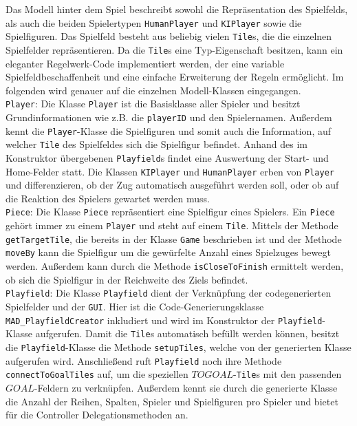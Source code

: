 \documentclass[conference]{IEEEtran}
\begin{document}
Das Modell hinter dem Spiel beschreibt sowohl die Repr\"asentation des Spielfelds, als auch die beiden Spielertypen \texttt{HumanPlayer} und \texttt{KIPlayer} sowie die Spielfiguren. Das Spielfeld besteht aus beliebig vielen \texttt{Tile}s, die die einzelnen Spielfelder repr\"asentieren. Da die \texttt{Tile}s eine Typ-Eigenschaft besitzen, kann ein eleganter Regelwerk-Code implementiert werden, der eine variable Spielfeldbeschaffenheit und eine einfache Erweiterung der Regeln erm\"oglicht.
Im folgenden wird genauer auf die einzelnen Modell-Klassen eingegangen.\\

\texttt{Player}: Die Klasse \texttt{Player} ist die Basisklasse aller Spieler und besitzt Grundinformationen wie z.B. die \texttt{playerID} und den Spielernamen. Au{\ss}erdem kennt die \texttt{Player}-Klasse die Spielfiguren und somit auch die Information, auf welcher \texttt{Tile} des Spielfeldes sich die Spielfigur befindet. Anhand des im Konstruktor \"ubergebenen \texttt{Playfield}s findet eine Auswertung der Start- und Home-Felder statt. Die Klassen \texttt{KIPlayer} und \texttt{HumanPlayer} erben von \texttt{Player} und differenzieren, ob der Zug automatisch ausgef\"uhrt werden soll, oder ob auf die Reaktion des Spielers gewartet werden muss. \\

\texttt{Piece}: Die Klasse \texttt{Piece} repr\"asentiert eine Spielfigur eines Spielers. Ein \texttt{Piece} geh\"ort immer zu einem \texttt{Player} und steht auf einem \texttt{Tile}. Mittels der Methode \texttt{getTargetTile}, die bereits in der Klasse \texttt{Game} beschrieben ist und der Methode \texttt{moveBy} kann die Spielfigur um die gew\"urfelte Anzahl eines Spielzuges bewegt werden. Au{\ss}erdem kann durch die Methode \texttt{isCloseToFinish} ermittelt werden, ob sich die Spielfigur in der Reichweite des Ziels befindet. \\

\label{sec:model_playfield}
\texttt{Playfield}: Die Klasse \texttt{Playfield} dient der Verkn\"upfung der codegenerierten Spielfelder und der \texttt{GUI}. Hier ist die Code-Generierungsklasse \texttt{MAD\_PlayfieldCreator} inkludiert und wird im Konstruktor der \texttt{Playfield}-Klasse aufgerufen. Damit die \texttt{Tile}s automatisch bef\"ullt werden k\"onnen, besitzt die \texttt{Playfield}-Klasse die Methode \texttt{setupTiles}, welche von der generierten Klasse aufgerufen wird. Anschlie\ss end ruft \texttt{Playfield} noch ihre Methode \texttt{connectToGoalTiles} auf, um die speziellen $TOGOAL$-\texttt{Tile}s mit den passenden
$GOAL$-Feldern zu verkn\"upfen. Au{\ss}erdem kennt sie durch die generierte Klasse die Anzahl der Reihen, Spalten, Spieler und Spielfiguren pro Spieler und bietet f\"ur die Controller Delegationsmethoden an.\\
\end{document}
